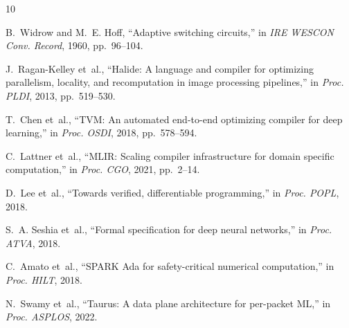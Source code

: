 \documentclass[10pt,conference]{IEEEtran}
\begin{document}

\begin{thebibliography}{10}

B.~Widrow and M.~E. Hoff, ``Adaptive switching circuits,'' in
\emph{IRE WESCON Conv. Record}, 1960, pp.~96--104.

J.~Ragan-Kelley et~al., ``Halide: A language and compiler for optimizing
parallelism, locality, and recomputation in image processing pipelines,''
in \emph{Proc. PLDI}, 2013, pp.~519--530.

T.~Chen et~al., ``TVM: An automated end-to-end optimizing compiler for deep
learning,'' in \emph{Proc. OSDI}, 2018, pp.~578--594.

C.~Lattner et~al., ``MLIR: Scaling compiler infrastructure for domain specific
computation,'' in \emph{Proc. CGO}, 2021, pp.~2--14.

D.~Lee et~al., ``Towards verified, differentiable programming,''
in \emph{Proc. POPL}, 2018.

S.~A. Seshia et~al., ``Formal specification for deep neural networks,''
in \emph{Proc. ATVA}, 2018.

C.~Amato et~al., ``SPARK Ada for safety-critical numerical computation,''
in \emph{Proc. HILT}, 2018.

N.~Swamy et~al., ``Taurus: A data plane architecture for per-packet ML,''
in \emph{Proc. ASPLOS}, 2022.

\end{thebibliography}
\end{document}
